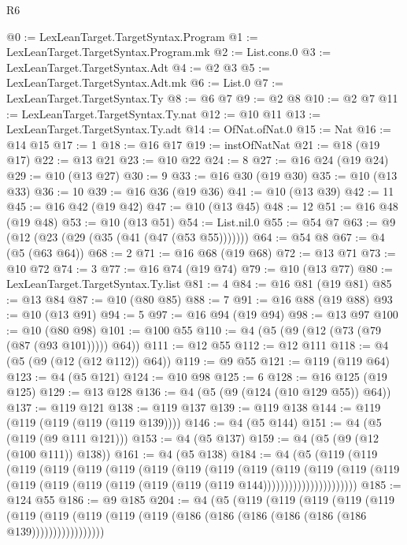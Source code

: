 \begin{lexlean}{R6}
\begin{coremodule}
@0 := LexLeanTarget.TargetSyntax.Program
@1 := LexLeanTarget.TargetSyntax.Program.mk
@2 := List.cons.{0}
@3 := LexLeanTarget.TargetSyntax.Adt
@4 := @2 @3
@5 := LexLeanTarget.TargetSyntax.Adt.mk
@6 := List.{0}
@7 := LexLeanTarget.TargetSyntax.Ty
@8 := @6 @7
@9 := @2 @8
@10 := @2 @7
@11 := LexLeanTarget.TargetSyntax.Ty.nat
@12 := @10 @11
@13 := LexLeanTarget.TargetSyntax.Ty.adt
@14 := OfNat.ofNat.{0}
@15 := Nat
@16 := @14 @15
@17 := 1
@18 := @16 @17
@19 := instOfNatNat
@21 := @18 (@19 @17)
@22 := @13 @21
@23 := @10 @22
@24 := 8
@27 := @16 @24 (@19 @24)
@29 := @10 (@13 @27)
@30 := 9
@33 := @16 @30 (@19 @30)
@35 := @10 (@13 @33)
@36 := 10
@39 := @16 @36 (@19 @36)
@41 := @10 (@13 @39)
@42 := 11
@45 := @16 @42 (@19 @42)
@47 := @10 (@13 @45)
@48 := 12
@51 := @16 @48 (@19 @48)
@53 := @10 (@13 @51)
@54 := List.nil.{0}
@55 := @54 @7
@63 := @9 (@12 (@23 (@29 (@35 (@41 (@47 (@53 @55)))))))
@64 := @54 @8
@67 := @4 (@5 (@63 @64))
@68 := 2
@71 := @16 @68 (@19 @68)
@72 := @13 @71
@73 := @10 @72
@74 := 3
@77 := @16 @74 (@19 @74)
@79 := @10 (@13 @77)
@80 := LexLeanTarget.TargetSyntax.Ty.list
@81 := 4
@84 := @16 @81 (@19 @81)
@85 := @13 @84
@87 := @10 (@80 @85)
@88 := 7
@91 := @16 @88 (@19 @88)
@93 := @10 (@13 @91)
@94 := 5
@97 := @16 @94 (@19 @94)
@98 := @13 @97
@100 := @10 (@80 @98)
@101 := @100 @55
@110 := @4 (@5 (@9 (@12 (@73 (@79 (@87 (@93 @101))))) @64))
@111 := @12 @55
@112 := @12 @111
@118 := @4 (@5 (@9 (@12 (@12 @112)) @64))
@119 := @9 @55
@121 := @119 (@119 @64)
@123 := @4 (@5 @121)
@124 := @10 @98
@125 := 6
@128 := @16 @125 (@19 @125)
@129 := @13 @128
@136 := @4 (@5 (@9 (@124 (@10 @129 @55)) @64))
@137 := @119 @121
@138 := @119 @137
@139 := @119 @138
@144 := @119 (@119 (@119 (@119 (@119 @139))))
@146 := @4 (@5 @144)
@151 := @4 (@5 (@119 (@9 @111 @121)))
@153 := @4 (@5 @137)
@159 := @4 (@5 (@9 (@12 (@100 @111)) @138))
@161 := @4 (@5 @138)
@184 := @4
    (@5
      (@119
        (@119
          (@119
            (@119
              (@119
                (@119
                  (@119
                    (@119
                      (@119
                        (@119
                          (@119
                            (@119
                              (@119
                                (@119
                                  (@119
                                    (@119 (@119 (@119 (@119 (@119 (@119 @144))))))))))))))))))))))
@185 := @124 @55
@186 := @9 @185
@204 := @4
    (@5
      (@119
        (@119
          (@119
            (@119
              (@119
                (@119
                  (@119 (@119 (@119 (@119 (@186 (@186 (@186 (@186 (@186 (@186 @139)))))))))))))))))

\end{coremodule}
\end{lexlean}
